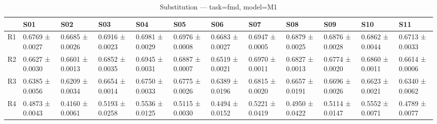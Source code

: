 \begin{table}[htbp]
\centering
\caption{Substitution — task=fmd, model=M1}
\label{tab:sub:fmd:M1}
\begin{tabular}{llllllllllll}
\toprule
\toprule
 & S01 & S02 & S03 & S04 & S05 & S06 & S07 & S08 & S09 & S10 & S11 \\
\midrule
\midrule
R1 & 0.6769 ± 0.0027 & 0.6685 ± 0.0026 & 0.6916 ± 0.0023 & 0.6981 ± 0.0029 & 0.6976 ± 0.0008 & 0.6683 ± 0.0027 & 0.6947 ± 0.0005 & 0.6879 ± 0.0025 & 0.6876 ± 0.0028 & 0.6862 ± 0.0044 & 0.6713 ± 0.0033 \\
R2 & 0.6627 ± 0.0030 & 0.6601 ± 0.0013 & 0.6852 ± 0.0035 & 0.6945 ± 0.0031 & 0.6887 ± 0.0007 & 0.6519 ± 0.0021 & 0.6970 ± 0.0011 & 0.6827 ± 0.0013 & 0.6774 ± 0.0020 & 0.6860 ± 0.0011 & 0.6614 ± 0.0006 \\
R3 & 0.6385 ± 0.0056 & 0.6209 ± 0.0034 & 0.6654 ± 0.0014 & 0.6750 ± 0.0033 & 0.6775 ± 0.0026 & 0.6389 ± 0.0196 & 0.6815 ± 0.0020 & 0.6657 ± 0.0191 & 0.6696 ± 0.0026 & 0.6623 ± 0.0021 & 0.6340 ± 0.0062 \\
R4 & 0.4873 ± 0.0043 & 0.4160 ± 0.0061 & 0.5193 ± 0.0258 & 0.5536 ± 0.0125 & 0.5115 ± 0.0030 & 0.4494 ± 0.0152 & 0.5221 ± 0.0419 & 0.4950 ± 0.0422 & 0.5114 ± 0.0147 & 0.5552 ± 0.0071 & 0.4789 ± 0.0077 \\
\bottomrule
\end{tabular}\end{table}
